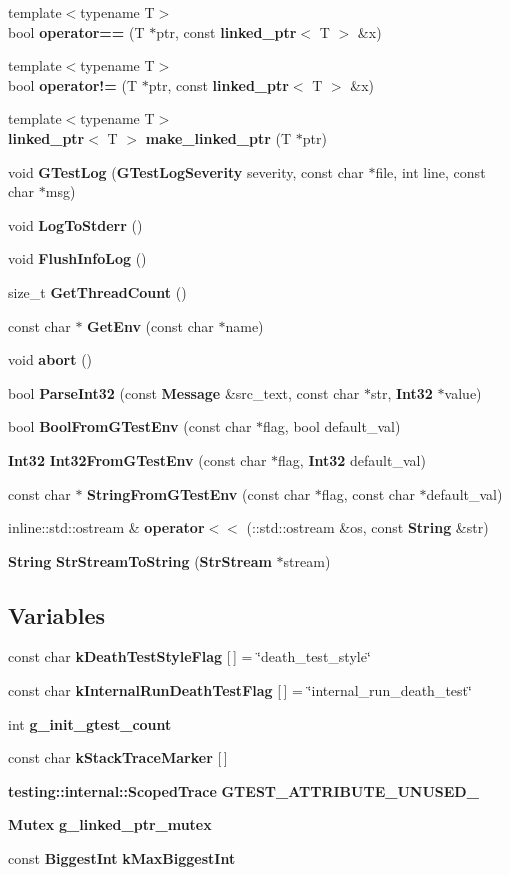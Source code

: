 \begin{CompactItemize}
{\footnotesize template$<$typename T$>$ }\\bool {\bf operator==} (T $\ast$ptr, const {\bf linked\_\-ptr}$<$ T $>$ \&x)
\item 
{\footnotesize template$<$typename T$>$ }\\bool {\bf operator!=} (T $\ast$ptr, const {\bf linked\_\-ptr}$<$ T $>$ \&x)
\item 
{\footnotesize template$<$typename T$>$ }\\{\bf linked\_\-ptr}$<$ T $>$ {\bf make\_\-linked\_\-ptr} (T $\ast$ptr)
\item 
void {\bf GTestLog} ({\bf GTestLogSeverity} severity, const char $\ast$file, int line, const char $\ast$msg)
\item 
void {\bf LogToStderr} ()
\item 
void {\bf FlushInfoLog} ()
\item 
size\_\-t {\bf GetThreadCount} ()
\item 
const char $\ast$ {\bf GetEnv} (const char $\ast$name)
\item 
void {\bf abort} ()
\item 
bool {\bf ParseInt32} (const {\bf Message} \&src\_\-text, const char $\ast$str, {\bf Int32} $\ast$value)
\item 
bool {\bf BoolFromGTestEnv} (const char $\ast$flag, bool default\_\-val)
\item 
{\bf Int32} {\bf Int32FromGTestEnv} (const char $\ast$flag, {\bf Int32} default\_\-val)
\item 
const char $\ast$ {\bf StringFromGTestEnv} (const char $\ast$flag, const char $\ast$default\_\-val)
\item 
inline::std::ostream \& {\bf operator$<$$<$} (::std::ostream \&os, const {\bf String} \&str)
\item 
{\bf String} {\bf StrStreamToString} ({\bf StrStream} $\ast$stream)
\end{CompactItemize}
\subsection*{Variables}
\begin{CompactItemize}
\item 
const char {\bf kDeathTestStyleFlag} [$\,$] = \char`\"{}death\_\-test\_\-style\char`\"{}
\item 
const char {\bf kInternalRunDeathTestFlag} [$\,$] = \char`\"{}internal\_\-run\_\-death\_\-test\char`\"{}
\item 
int {\bf g\_\-init\_\-gtest\_\-count}
\item 
const char {\bf kStackTraceMarker} [$\,$]
\item 
{\bf testing::internal::ScopedTrace} {\bf GTEST\_\-ATTRIBUTE\_\-UNUSED\_\-}
\item 
{\bf Mutex} {\bf g\_\-linked\_\-ptr\_\-mutex}
\item 
const {\bf BiggestInt} {\bf kMaxBiggestInt}
\end{CompactItemize}


